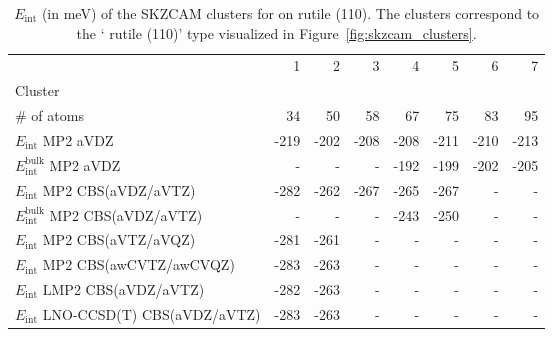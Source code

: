 \begin{table}
\caption{\label{tab:system_eint_r-tio2_ch4}$E_\textrm{int}$ (in meV) of the SKZCAM clusters for  on  rutile (110). The clusters correspond to the ` rutile (110)' type visualized in Figure~\ref{fig:skzcam_clusters}.}
\begin{adjustbox}{center,max width=1.4\textwidth}
\begin{tabular}{lrrrrrrr}
\toprule
 & 1 & 2 & 3 & 4 & 5 & 6 & 7 \\ 
Cluster &  &  &  &  &  &  &  \\
\midrule
\# of atoms & 34 & 50 & 58 & 67 & 75 & 83 & 95 \\
$E_\textrm{int}$ MP2 aVDZ & -219 & -202 & -208 & -208 & -211 & -210 & -213 \\
$E_\textrm{int}^\textrm{bulk}$ MP2 aVDZ & - & - & - & -192 & -199 & -202 & -205 \\
$E_\textrm{int}$ MP2 CBS(aVDZ/aVTZ) & -282 & -262 & -267 & -265 & -267 & - & - \\
$E_\textrm{int}^\textrm{bulk}$ MP2 CBS(aVDZ/aVTZ) & - & - & - & -243 & -250 & - & - \\
$E_\textrm{int}$ MP2 CBS(aVTZ/aVQZ) & -281 & -261 & - & - & - & - & - \\
$E_\textrm{int}$ MP2 CBS(awCVTZ/awCVQZ) & -283 & -263 & - & - & - & - & - \\
$E_\textrm{int}$ LMP2 CBS(aVDZ/aVTZ) & -282 & -263 & - & - & - & - & - \\
$E_\textrm{int}$ LNO-CCSD(T) CBS(aVDZ/aVTZ) & -283 & -263 & - & - & - & - & - \\
\bottomrule
\end{tabular}
\end{adjustbox}
\end{table}

